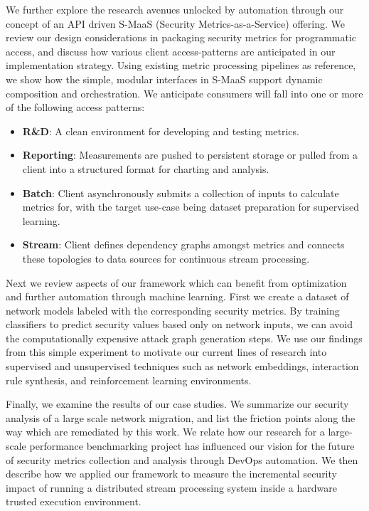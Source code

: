 We further explore the research avenues unlocked by automation through our concept of an API driven S-MaaS (Security Metrics-as-a-Service) offering. We review our design considerations in packaging security metrics for programmatic access, and discuss how various client access-patterns are anticipated in our implementation strategy. Using existing metric processing pipelines as reference, we show how the simple, modular interfaces in S-MaaS support dynamic composition and orchestration. We anticipate consumers will fall into one or more of the following access patterns:
\begin{itemize}
\item \textbf{R\&D}: A clean environment for developing and testing metrics.
\item \textbf{Reporting}: Measurements are pushed to persistent storage or pulled from a client into a structured format for charting and analysis. 
\item \textbf{Batch}: Client asynchronously submits a collection of inputs to calculate metrics for, with the target use-case being dataset preparation for supervised learning.
\item \textbf{Stream}: Client defines dependency graphs amongst metrics and connects these topologies to data sources for continuous stream processing.  
\end{itemize}


Next we review aspects of our framework which can benefit from optimization and further automation through machine learning. First we create a dataset of network models labeled with the corresponding security metrics. By training classifiers to predict security values based only on network inputs, we can avoid the computationally expensive attack graph generation steps. We use our findings  from this simple experiment to motivate our current lines of research into supervised and unsupervised techniques such as network embeddings, interaction rule synthesis, and reinforcement learning environments. 

Finally, we examine the results of our case studies. We summarize our security analysis of a large scale network migration, and list the friction points along the way which are remediated by this work. We relate how our research for a  large-scale performance benchmarking project has influenced our vision for the future of security metrics collection and analysis through DevOps automation. We then describe how we applied our framework to measure the incremental security impact of running a distributed stream processing system inside a hardware trusted execution environment.

